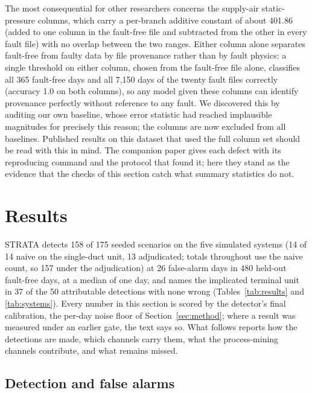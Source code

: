 \documentclass[11pt,letterpaper]{article}
\begin{document}
The most consequential for other researchers concerns the supply-air static-pressure columns, which carry a per-branch additive constant of about 401.86 (added to one column in the fault-free file and subtracted from the other in every fault file) with no overlap between the two ranges. Either column alone separates fault-free from faulty data by file provenance rather than by fault physics: a single threshold on either column, chosen from the fault-free file alone, classifies all 365 fault-free days and all 7{,}150 days of the twenty fault files correctly (accuracy 1.0 on both columns), so any model given these columns can identify provenance perfectly without reference to any fault. We discovered this by auditing our own baseline, whose error statistic had reached implausible magnitudes for precisely this reason; the columns are now excluded from all baselines. Published results on this dataset that used the full column set should be read with this in mind. The companion paper \cite{singh2027erratacompanion} gives each defect with its reproducing command and the protocol that found it; here they stand as the evidence that the checks of this section catch what summary statistics do not.

\section{Results}
\label{sec:results}

STRATA detects 158 of 175 seeded scenarios on the five simulated systems (14 of 14 naive on the single-duct unit, 13 adjudicated; totals throughout use the naive count, so 157 under the adjudication) at 26 false-alarm days in 480 held-out fault-free days, at a median of one day, and names the implicated terminal unit in 37 of the 50 attributable detections with none wrong (Tables~\ref{tab:results} and \ref{tab:systems}). Every number in this section is scored by the detector's final calibration, the per-day noise floor of Section~\ref{sec:method}; where a result was measured under an earlier gate, the text says so. What follows reports how the detections are made, which channels carry them, what the process-mining channels contribute, and what remains missed.

\subsection{Detection and false alarms}
\label{sec:detection}
\end{document}
